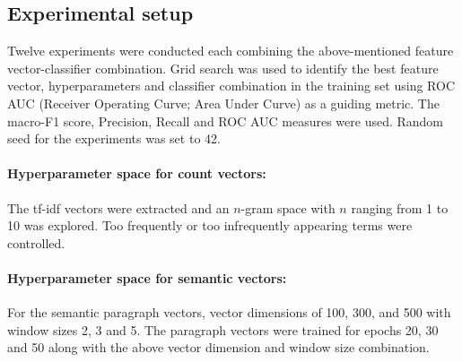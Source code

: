 \documentclass[runningheads]{llncs}
\begin{document}
\subsection{Experimental setup}
\label{sec:experiments}
%
Twelve experiments were conducted each combining the above-mentioned feature vector-classifier combination.
Grid search was used to identify the best feature vector, hyperparameters and classifier combination in the training set using ROC AUC (Receiver Operating Curve; Area Under Curve) as a guiding metric.
The macro-F1 score, Precision, Recall and ROC AUC measures were used.
Random seed for the experiments was set to 42.
%
\paragraph{Hyperparameter space for count vectors: } 
%
The tf-idf vectors were extracted and an $n$-gram space with $n$ ranging from 1 to 10 was explored.
Too frequently or too infrequently appearing terms were controlled.
%
\paragraph{Hyperparameter space for semantic vectors: } 
%
For the semantic paragraph vectors, vector dimensions of 100, 300, and 500 with window sizes 2, 3 and 5.
The paragraph vectors were trained for epochs 20, 30 and 50 along with the above vector dimension and window size combination.
%
\end{document}
